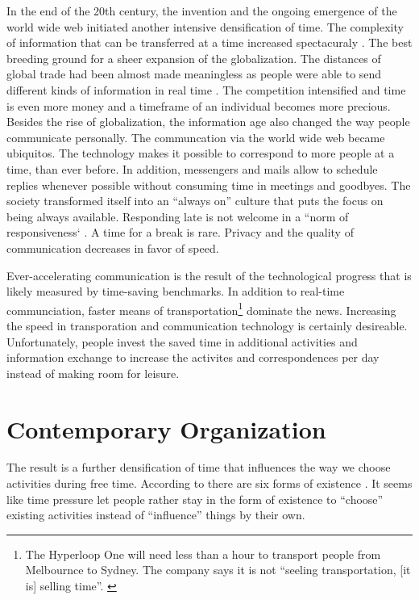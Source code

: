 \documentclass[12pt,numbers=noenddot,parskip,bibliography=totocnumbered,listof=totocnumbered]{scrreprt}
\begin{document}
In the end of the 20th century, the invention and the ongoing emergence of the world wide web initiated another intensive densification of time. The complexity of information that can be transferred at a time increased spectacuraly \citep[p.45]{wajcman2014}. The best breeding ground for a sheer expansion of the globalization. The distances of global trade had been almost made meaningless as people were able to send different kinds of information in real time \citep[p.17]{wajcman2014}. The competition intensified and time is even more money and a timeframe of an individual becomes more precious. Besides the rise of globalization, the information age also changed the way people communicate personally. The communcation via the world wide web became ubiquitos. The technology makes it possible to correspond to more people at a time, than ever before. In addition, messengers and mails allow to schedule replies whenever possible without consuming time in meetings and goodbyes. The society transformed itself into an ``always on'' culture that puts the focus on being always available. Responding late is not welcome in a ``norm of responsiveness` \citep[p.96]{wajcman2014}. A time for a break is rare. Privacy and the quality of communication decreases in favor of speed.

Ever-accelerating communication is the result of the technological progress that is likely measured by time-saving benchmarks. In addition to real-time communciation, faster means of transportation\footnote{The Hyperloop One will need less than a hour to transport people from Melbournce to Sydney. The company says it is not ``seeling transportation, [it is] selling time''. \cite{hyperloop2017}} dominate the news. Increasing the speed in transporation and communication technology is certainly desireable. Unfortunately, people invest the saved time in additional activities and information exchange to increase the activites and correspondences per day instead of making room for leisure. \citep[p.364?]{gross1994} 

\section{Contemporary Organization}
The result is a further densification of time that influences the way we choose activities during free time. According to \citeauthor{schulze2005} there are six forms of existence \citep[p.198-206]{schulze2005}. It seems like time pressure let people rather stay in the form of existence to ``choose'' existing activities instead of ``influence'' things by their own. 
\end{document}
